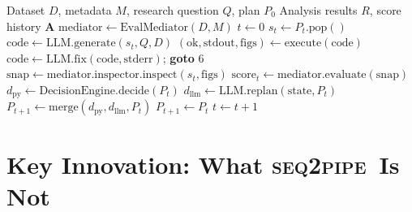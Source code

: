 \documentclass[11pt,a4paper]{article}
\newcommand{\seqpipe}{\textsc{seq2pipe}}
\begin{document}
\begin{algorithm}[t]
\caption{Adaptive Execution Loop}
\label{alg:loop}
\begin{algorithmic}[1]
\REQUIRE Dataset $D$, metadata $M$, research question $Q$, plan $P_0$
\ENSURE Analysis results $R$, score history $\mathbf{A}$
\STATE $\mathrm{mediator} \gets \mathrm{EvalMediator}(D, M)$
\STATE $t \gets 0$
  \STATE $s_t \gets P_t.\mathrm{pop}()$
  \STATE $\mathrm{code} \gets \mathrm{LLM.generate}(s_t, Q, D)$
  \STATE $(\mathrm{ok}, \mathrm{stdout}, \mathrm{figs}) \gets \mathrm{execute}(\mathrm{code})$
    \STATE $\mathrm{code} \gets \mathrm{LLM.fix}(\mathrm{code}, \mathrm{stderr})$; \textbf{goto} 6
  \ENDIF
  \STATE $\mathrm{snap} \gets \mathrm{mediator.inspector.inspect}(s_t, \mathrm{figs})$
  \STATE $\mathrm{score}_t \gets \mathrm{mediator.evaluate}(\mathrm{snap})$
    \STATE $d_{\mathrm{py}} \gets \mathrm{DecisionEngine.decide}(P_t)$
    \STATE $d_{\mathrm{llm}} \gets \mathrm{LLM.replan}(\mathrm{state}, P_t)$
    \STATE $P_{t+1} \gets \mathrm{merge}(d_{\mathrm{py}}, d_{\mathrm{llm}}, P_t)$
  \ELSE
    \STATE $P_{t+1} \gets P_t$
  \ENDIF
  \STATE $t \gets t + 1$
\ENDWHILE
\end{algorithmic}
\end{algorithm}

\section{Key Innovation: What \seqpipe\ Is Not}
\label{sec:innovation}
\end{document}
